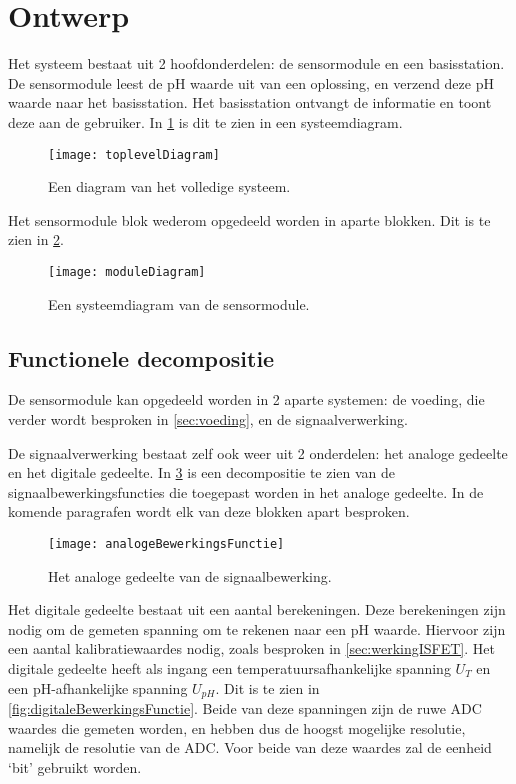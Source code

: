 \section{Ontwerp}
Het systeem bestaat uit 2 hoofdonderdelen: de sensormodule en een basisstation. De sensormodule leest de pH waarde uit van een oplossing, en verzend deze pH waarde naar het basisstation. Het basisstation ontvangt de informatie en toont deze aan de gebruiker.
In \cref{fig:functional} is dit te zien in een systeemdiagram.

\begin{figure}[ht]
    \centering
    \texttt{[image: toplevelDiagram]}
    \caption[short]{Een diagram van het volledige systeem.}
    \label{fig:functional}
\end{figure}

Het sensormodule blok wederom opgedeeld worden in aparte blokken. Dit is te zien in \cref{fig:moduleDiagram}.

\begin{figure}[ht]
    \centering
    \texttt{[image: moduleDiagram]}
    \caption{Een systeemdiagram van de sensormodule.} 
    \label{fig:moduleDiagram}
\end{figure}

\subsection{Functionele decompositie}
De sensormodule kan opgedeeld worden in 2 aparte systemen: de voeding, die verder wordt besproken in \cref{sec:voeding}, en de signaalverwerking.

De signaalverwerking bestaat zelf ook weer uit 2 onderdelen: het analoge gedeelte en het digitale gedeelte. In \cref{fig:analogeBewerkingsFunctie} is een decompositie te zien van de signaalbewerkingsfuncties die toegepast worden in het analoge gedeelte. In de komende paragrafen wordt elk van deze blokken apart besproken.

\begin{figure}[ht]
    \centering
    \texttt{[image: analogeBewerkingsFunctie]}
    \caption{Het analoge gedeelte van de signaalbewerking.} 
    \label{fig:analogeBewerkingsFunctie}
\end{figure}


Het digitale gedeelte bestaat uit een aantal berekeningen. Deze berekeningen zijn nodig om de gemeten spanning om te rekenen naar een pH waarde. Hiervoor zijn een aantal kalibratiewaardes nodig, zoals besproken in \cref{sec:werkingISFET}. Het digitale gedeelte heeft als ingang een temperatuursafhankelijke spanning $U_T$ en een pH-afhankelijke spanning $U_{pH}$. Dit is te zien in \cref{fig:digitaleBewerkingsFunctie}. Beide van deze spanningen zijn de ruwe ADC waardes die gemeten worden, en hebben dus de hoogst mogelijke resolutie, namelijk de resolutie van de ADC. Voor beide van deze waardes zal de eenheid `bit' gebruikt worden.

